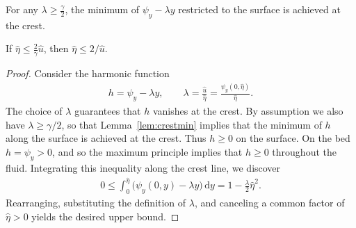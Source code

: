 \documentclass[10pt,a4paper]{amsart}
\newcommand{\ucrest}{\hat u} %
\begin{document}
\begin{lemma} \label{lem:crestmin} 
  For any $\lambda \ge \tfrac{\gamma}{2}$, the minimum of $\psi_y - \lambda y$ restricted to the surface is achieved at the crest.
\end{lemma}

\begin{lemma} \label{lem:etabound} 
  If $\hat \eta \le \frac 2\gamma \ucrest$, then $\hat \eta \le 2/\ucrest$.
\end{lemma}

\begin{proof}
  Consider the harmonic function
  \begin{align*}
    h = \psi_y - \lambda y,
    \qquad 
    \lambda 
    = \frac{\ucrest}{\hat \eta}
    = \frac{\psi_y(0,\hat\eta)}{\hat \eta}.
  \end{align*}
  The choice of $\lambda$ guarantees that $h$ vanishes at the crest. By assumption we also have $\lambda \ge \gamma/2$, so that Lemma~\ref{lem:crestmin} implies that the minimum of $h$ along the surface is achieved at the crest. Thus $h \ge 0$ on the surface. On the bed $h = \psi_y > 0$, and so the maximum principle implies that $h \ge 0$ throughout the fluid. Integrating this inequality along the crest line, we discover
  \begin{align*}
    0 \le \int_0^{\hat \eta} \big(\psi_y(0,y) - \lambda y\big) \, \mathrm dy
    = 1 - \frac \lambda 2 {\hat \eta}^2.
  \end{align*}
  Rearranging, substituting the definition of $\lambda$, and canceling a common factor of $\hat \eta > 0$ yields the desired upper bound.
\end{proof}
\end{document}
